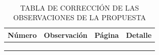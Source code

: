 \newpage
\thispagestyle{empty} \textbf{}\normalsize
\\\\\\%
\begin{table}[h!]
	\caption{TABLA DE CORRECCIÓN DE LAS OBSERVACIONES DE LA PROPUESTA}
	\begin{tabular}{|c|c|c|p{8cm}|}
		\hline Número & Observación & Página & Detalle  \\ 
		\hline  & { } &  & { }  \\ 
		\hline  &  &  &  \\ 
		\hline  &  &  &  \\ 
		\hline 
	\end{tabular}
\end{table}

